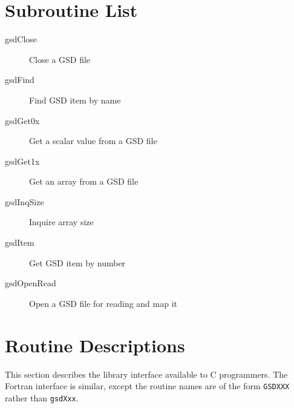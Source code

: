 \documentclass[twoside,11pt]{article}
\newcommand{\htmlref}[2]{#1}
\renewcommand{\_}{\texttt{\symbol{95}}}
\begin{document}
\section{Subroutine List}

\begin{description}
\item[\htmlref{gsdClose}{gsdClose}] \mbox{}

Close a GSD file

\item[\htmlref{gsdFind}{gsdFind}] \mbox{}

Find GSD item by name

\item[\htmlref{gsdGet0x}{gsdGet0_SPMlt_t_SPMgt_}] \mbox{}

Get a scalar value from a GSD file

\item[\htmlref{gsdGet1x}{gsdGet1_SPMlt_t_SPMgt_}] \mbox{}

Get an array from a GSD file

\item[\htmlref{gsdInqSize}{gsdInqSize}] \mbox{}

Inquire array size

\item[\htmlref{gsdItem}{gsdItem}] \mbox{}

Get GSD item by number

\item[\htmlref{gsdOpenRead}{gsdOpenRead}] \mbox{}

Open a GSD file for reading and map it

\end{description}


\section{Routine Descriptions\label{app:desc}}

This section describes the library interface available to C programmers.
The Fortran interface is similar, except the routine names are of the
form \texttt{GSD\_XXX} rather than \texttt{gsdXxx}.
\end{document}

